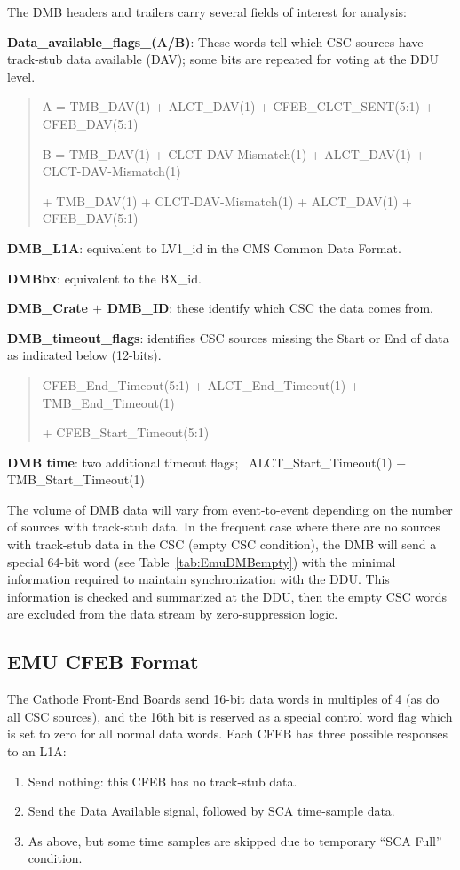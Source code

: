 The DMB headers and trailers carry several fields of interest for analysis:
\begin{description}
\item {\bf Data\_available\_flags\_(A/B)}: These words tell which CSC sources
have track-stub data available (DAV); some bits are repeated for voting at
the DDU level.
\begin{quotation}
  A = TMB\_DAV(1) + ALCT\_DAV(1) + CFEB\_CLCT\_SENT(5:1) + CFEB\_DAV(5:1)

  B = TMB\_DAV(1) + CLCT-DAV-Mismatch(1) + ALCT\_DAV(1) + CLCT-DAV-Mismatch(1)

\hspace{.2in} + TMB\_DAV(1) + CLCT-DAV-Mismatch(1) + ALCT\_DAV(1) + CFEB\_DAV(5:1)
\end{quotation}
\item {\bf DMB\_L1A}: equivalent to LV1\_id in the CMS Common Data Format.
\item {\bf DMBbx}: equivalent to the BX\_id.
\item {\bf DMB\_Crate $+$ DMB\_ID}: these identify which CSC the data comes
from.
\item {\bf DMB\_timeout\_flags}: identifies CSC sources missing the Start
or End of data as indicated below (12-bits).
\begin{quotation}
 CFEB\_End\_Timeout(5:1) + ALCT\_End\_Timeout(1) + TMB\_End\_Timeout(1)

\hspace{.2in} + CFEB\_Start\_Timeout(5:1)
\end{quotation}
\item {\bf DMB time}: two additional timeout flags; \, ALCT\_Start\_Timeout(1) + TMB\_Start\_Timeout(1)
\end{description}

The volume of DMB data will vary from event-to-event depending on the number
of sources with track-stub data.  In the frequent case where there are no
sources with track-stub data in the CSC (empty CSC condition), the DMB
will send a special 64-bit word (see Table~\ref{tab:EmuDMBempty})
with the minimal information required to maintain
synchronization with the DDU.
This information is checked and summarized at the DDU, then the
empty CSC words are excluded from the data stream by zero-suppression logic.

\subsection{EMU CFEB Format}\label{sec:EmuCFEB}
The Cathode Front-End Boards
send 16-bit data words in multiples of 4 (as do all CSC sources),
and the 16th bit is reserved as a special control word flag which is set to
zero for all normal data words.  Each CFEB has three possible responses to
an L1A:
\begin{enumerate}
\item   Send nothing: this CFEB has no track-stub data.
\item   Send the Data Available signal, followed by SCA time-sample data.
\item   As above, but some time samples are skipped due to temporary
``SCA Full'' condition.
\end{enumerate}


